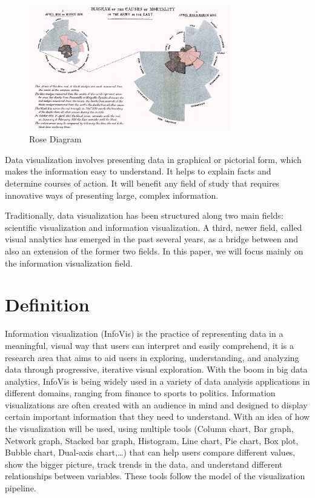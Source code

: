 \begin{figure}[h!]
    \center
    \includegraphics[width=0.78\textwidth]{images/chapter2/rose.jpg}
    \caption{Rose Diagram}
    \label{fig:roseDiagram}
  \end{figure}


  Data visualization involves presenting data in graphical or pictorial form, which makes the information easy to understand. It helps to explain facts and determine courses of action. It will benefit any field of study that requires innovative ways of presenting large, complex information\cite{spence2001information}.



  Traditionally, data visualization has been structured along two main fields: scientific visualization and information visualization. A third, newer field, called visual analytics has emerged in the past several years, as a bridge between and also an extension of the former two fields\cite{teleaDataVisualizationPrinciples2008}. In this paper, we will focus mainly on the information visualization field.
\newpage
\section{Definition}
Information visualization (InfoVis) is the practice of representing data in a meaningful, visual way that users can interpret and easily comprehend, it is a research area that aims to aid users in exploring, understanding, and analyzing data through progressive, iterative visual exploration. With the boom in big data analytics, InfoVis is being widely used in a variety of data analysis applications in different domains, ranging from finance to sports to politics\cite{liuSurveyInformationVisualization2014}.
\bigbreak
Information visualizations are often created with an audience in mind and designed to display certain important information that they need to understand. With an idea of how the visualization will be used, using multiple tools (Column chart, Bar graph, Network graph, Stacked bar graph, Histogram, Line chart, Pie chart, Box plot, Bubble chart,  Dual-axis chart,…) that can help users compare different values, show the bigger picture, track trends in the data, and understand different relationships between variables\cite{WhatInformationVisualization}. These tools follow the model of the visualization pipeline. 

